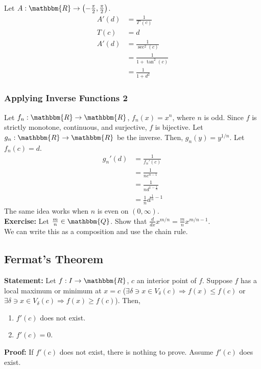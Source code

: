 \documentclass[10pt]{extarticle}
\newcommand{\Q}{\mathbbm{Q}}
\newcommand{\R}{\mathbbm{R}}
\begin{document}
    Let $A: \R\rightarrow \left(-\frac{\pi}{2},\frac{\pi}{2}\right)$. 
    \begin{align*}
      A'(d) &= \frac{1}{T'(c)}\\
      T(c) &= d\\
      A'(d) &= \frac{1}{\sec^2(c)}\\
            &=\frac{1}{1 + \tan^{2}(c)}\\
            &=\frac{1}{1+d^2}
    \end{align*}
  \subsubsection{Applying Inverse Functions 2}%
    Let $f_n: \R\rightarrow\R$, $f_n(x) = x^n$, where $n$ is odd. Since $f$ is strictly monotone, continuous, and surjective, $f$ is bijective. Let $g_n: \R\rightarrow \R$ be the inverse. Then, $g_n(y) = y^{1/n}$. Let $f_n(c) = d$.
    \begin{align*}
      g_n'(d) &= \frac{1}{f_n'(c)}\\
              &= \frac{1}{nc^{n-1}}\\
              &= \frac{1}{nd^{1-\frac{1}{n}}}\\
              &= \frac{1}{n}d^{\frac{1}{n}-1}
    \end{align*}
    The same idea works when $n$ is even on $(0,\infty)$.\\

    \textbf{Exercise:} Let $\frac{m}{n}\in\Q$. Show that $\frac{d}{dx}x^{m/n} = \frac{m}{n}x^{m/n-1}$.\\

    We can write this as a composition and use the chain rule.
  \subsection{Fermat's Theorem}%
    \textbf{Statement:} Let $f: I\rightarrow \R$, $c$ an interior point of $f$. Suppose $f$ has a local maximum or minimum at $x=c$ ($\exists \delta \ni x\in V_{\delta}(c) \Rightarrow f(x) \leq f(c)$ or $\exists \delta \ni x\in V_{\delta}(c) \Rightarrow f(x) \geq f(c)$). Then,
    \begin{enumerate}[(1)]
      \item $f'(c)$ does not exist.
      \item $f'(c) = 0$.
    \end{enumerate}

    \textbf{Proof:} If $f'(c)$ does not exist, there is nothing to prove. Assume $f'(c)$ does exist.\\
\end{document}
